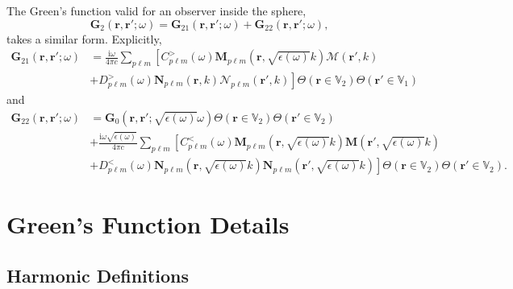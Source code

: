 \documentclass{article}
\begin{document}
The Green's function valid for an observer inside the sphere,
\begin{equation}
\mathbf{G}_2(\mathbf{r},\mathbf{r}';\omega) = \mathbf{G}_{21}(\mathbf{r},\mathbf{r}';\omega) + \mathbf{G}_{22}(\mathbf{r},\mathbf{r}';\omega),
\end{equation}
takes a similar form. Explicitly,
\begin{equation}
\begin{split}
\mathbf{G}_{21}(\mathbf{r},\mathbf{r}';\omega) &= \frac{\mathrm{i}\omega}{4\pi c}\sum_{p\ell m}\left[C_{p\ell m}^>(\omega)\mathbf{M}_{p\ell m}(\mathbf{r},\sqrt{\epsilon(\omega)}k)\bm{\mathcal{M}}(\mathbf{r}',k)\right.\\
&\left.+ D_{p\ell m}^>(\omega)\mathbf{N}_{p\ell m}(\mathbf{r},k)\bm{\mathcal{N}}_{p\ell m}(\mathbf{r}',k)\right]\Theta(\mathbf{r}\in\mathbb{V}_2)\Theta(\mathbf{r}'\in\mathbb{V}_1)
\end{split}
\end{equation}
and
\begin{equation}
\begin{split}
\mathbf{G}_{22}(\mathbf{r},\mathbf{r}';\omega) &= \mathbf{G}_0(\mathbf{r},\mathbf{r}';\sqrt{\epsilon(\omega)}\omega)\Theta(\mathbf{r}\in\mathbb{V}_2)\Theta(\mathbf{r}'\in\mathbb{V}_2)\\[0.5em]
&+ \frac{\mathrm{i}\omega\sqrt{\epsilon(\omega)}}{4\pi c}\sum_{p\ell m}\left[C_{p\ell m}^<(\omega)\mathbf{M}_{p\ell m}(\mathbf{r},\sqrt{\epsilon(\omega)}k)\mathbf{M}(\mathbf{r}',\sqrt{\epsilon(\omega)}k)\right.\\
&\left.+ D_{p\ell m}^<(\omega)\mathbf{N}_{p\ell m}(\mathbf{r},\sqrt{\epsilon(\omega)}k)\mathbf{N}_{p\ell m}(\mathbf{r}',\sqrt{\epsilon(\omega)}k)\right]\Theta(\mathbf{r}\in\mathbb{V}_2)\Theta(\mathbf{r}'\in\mathbb{V}_2).
\end{split}
\end{equation}








\section{Green's Function Details}\label{app:greenFuncDetails}



\subsection{Harmonic Definitions}
\end{document}
